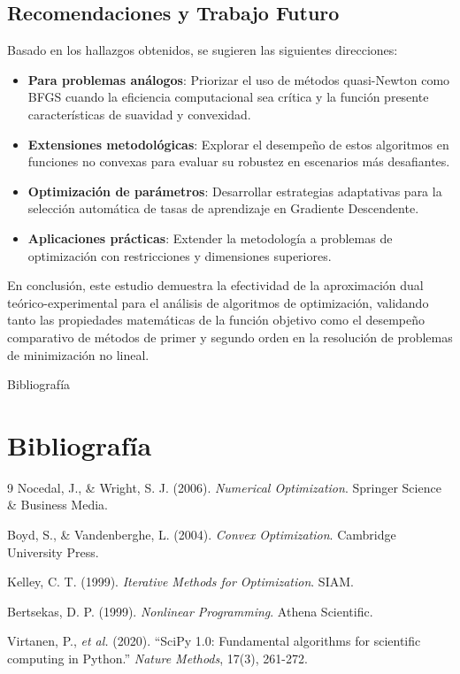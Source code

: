 \documentclass[11pt, a4paper, twocolumn]{beamer}
\begin{document}
		\subsection{Recomendaciones y Trabajo Futuro}
		
		Basado en los hallazgos obtenidos, se sugieren las siguientes direcciones:
		
		\begin{itemize}
			\item \textbf{Para problemas análogos}: Priorizar el uso de métodos quasi-Newton como BFGS cuando la eficiencia computacional sea crítica y la función presente características de suavidad y convexidad.
			
			\item \textbf{Extensiones metodológicas}: Explorar el desempeño de estos algoritmos en funciones no convexas para evaluar su robustez en escenarios más desafiantes.
			
			\item \textbf{Optimización de parámetros}: Desarrollar estrategias adaptativas para la selección automática de tasas de aprendizaje en Gradiente Descendente.
			
			\item \textbf{Aplicaciones prácticas}: Extender la metodología a problemas de optimización con restricciones y dimensiones superiores.
		\end{itemize}
		
		En conclusión, este estudio demuestra la efectividad de la aproximación dual teórico-experimental para el análisis de algoritmos de optimización, validando tanto las propiedades matemáticas de la función objetivo como el desempeño comparativo de métodos de primer y segundo orden en la resolución de problemas de minimización no lineal.
		\begin{frame}{Bibliografía}
			\section*{Bibliografía}
			
			\begin{thebibliography}{9}
				\footnotesize
				Nocedal, J., \& Wright, S. J. (2006).
				\textit{Numerical Optimization}.
				Springer Science \& Business Media.
				
				Boyd, S., \& Vandenberghe, L. (2004).
				\textit{Convex Optimization}.
				Cambridge University Press.
				
				Kelley, C. T. (1999).
				\textit{Iterative Methods for Optimization}.
				SIAM.
				
				Bertsekas, D. P. (1999).
				\textit{Nonlinear Programming}.
				Athena Scientific.
				
				Virtanen, P., \textit{et al.} (2020).
				``SciPy 1.0: Fundamental algorithms for scientific computing in Python.''
				\textit{Nature Methods}, 17(3), 261-272.
				
			\end{thebibliography}
		\end{frame}
\end{document}
